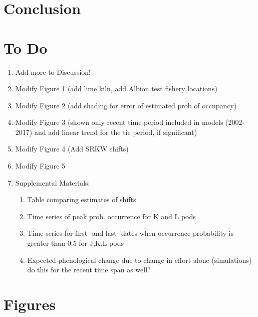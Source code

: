 \documentclass{article}
\begin{document}
\section*{Conclusion}

\section*{To Do}
\begin{enumerate}
\item Add more to Discussion!
\item Modify Figure 1 (add lime kiln, add Albion test fishery locations)
\item Modify Figure 2 (add shading for error of estimated prob of occupancy)
\item Modify Figure 3 (shown only recent time period included in models (2002-2017) and add linear trend for the tie period, if significant)
\item Modify Figure 4 (Add SRKW shifts)
\item Modify Figure 5 
\item Supplemental Materials:
\begin{enumerate}
\item Table comparing estimates of shifts
\item Time series of peak prob. occurrence for K and L pods
\item Time series for first- and last- dates when occurrence probability is greater than 0.5 for J,K,L pods
\item Expected phenological change due to change in effort alone (simulations)- do this for the recent time span as well?

\end{enumerate}
\end{enumerate}



\section* {Figures}
\end{document}
